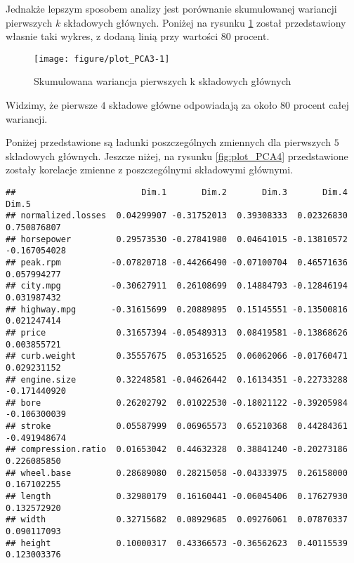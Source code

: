 \documentclass[12pt, a4paper]{article}\usepackage[]{graphicx}\usepackage[]{xcolor}
\makeatletter
\def\maxwidth{ %
  \ifdim\Gin@nat@width>\linewidth
    \linewidth
  \else
    \Gin@nat@width
  \fi
}
\newenvironment{kframe}{%
 \def\at@end@of@kframe{}%
 \ifinner\ifhmode%
  \def\at@end@of@kframe{\end{minipage}}%
  \begin{minipage}{\columnwidth}%
 \fi\fi%
 \def\FrameCommand##1{\hskip\@totalleftmargin \hskip-\fboxsep
 \colorbox{shadecolor}{##1}\hskip-\fboxsep
     \hskip-\linewidth \hskip-\@totalleftmargin \hskip\columnwidth}%
 \MakeFramed {\advance\hsize-\width
   \@totalleftmargin\z@ \linewidth\hsize
   \@setminipage}}%
 {\par\unskip\endMakeFramed%
 \at@end@of@kframe}
\newenvironment{knitrout}{}{} %
\makeatother
\begin{document}
Jednakże lepszym sposobem analizy jest porównanie skumulowanej wariancji pierwszych $k$ składowych głównych. Poniżej na rysunku \ref{fig:plot_PCA3} został przedstawiony własnie taki wykres, z dodaną linią przy wartości $80$ procent.
\begin{knitrout}
\color{fgcolor}\begin{figure}[H]

{\centering \texttt{[image: figure/plot\_PCA3-1]} 

}

\caption[Skumulowana wariancja pierwszych k składowych głównych]{Skumulowana wariancja pierwszych k składowych głównych}\label{fig:plot_PCA3}
\end{figure}

\end{knitrout}
Widzimy, że pierwsze $4$ składowe główne odpowiadają za około $80$ procent całej wariancji.  
\par Poniżej przedstawione są ładunki poszczególnych zmiennych dla pierwszych $5$ składowych głównych. Jeszcze niżej, na rysunku \ref{fig:plot_PCA4} przedstawione zostały korelacje zmienne z poszczególnymi składowymi głównymi.
\begin{knitrout}
\color{fgcolor}\begin{kframe}
\begin{verbatim}
##                         Dim.1       Dim.2       Dim.3       Dim.4        Dim.5
## normalized.losses  0.04299907 -0.31752013  0.39308333  0.02326830  0.750876807
## horsepower         0.29573530 -0.27841980  0.04641015 -0.13810572 -0.167054028
## peak.rpm          -0.07820718 -0.44266490 -0.07100704  0.46571636  0.057994277
## city.mpg          -0.30627911  0.26108699  0.14884793 -0.12846194  0.031987432
## highway.mpg       -0.31615699  0.20889895  0.15145551 -0.13500816  0.021247414
## price              0.31657394 -0.05489313  0.08419581 -0.13868626  0.003855721
## curb.weight        0.35557675  0.05316525  0.06062066 -0.01760471  0.029231152
## engine.size        0.32248581 -0.04626442  0.16134351 -0.22733288 -0.171440920
## bore               0.26202792  0.01022530 -0.18021122 -0.39205984 -0.106300039
## stroke             0.05587999  0.06965573  0.65210368  0.44284361 -0.491948674
## compression.ratio  0.01653042  0.44632328  0.38841240 -0.20273186  0.226085850
## wheel.base         0.28689080  0.28215058 -0.04333975  0.26158000  0.167102255
## length             0.32980179  0.16160441 -0.06045406  0.17627930  0.132572920
## width              0.32715682  0.08929685  0.09276061  0.07870337  0.090117093
## height             0.10000317  0.43366573 -0.36562623  0.40115539  0.123003376
\end{verbatim}
\end{kframe}
\end{knitrout}
\end{document}
